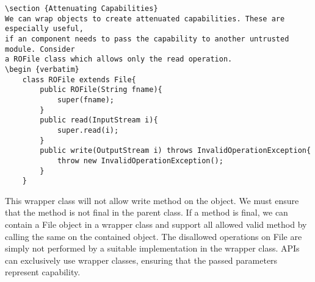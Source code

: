 \documentclass[11pt]{article} %
\begin{document}
\begin {verbatim}
\section {Attenuating Capabilities}
We can wrap objects to create attenuated capabilities. These are especially useful,
if an component needs to pass the capability to another untrusted module. Consider
a ROFile class which allows only the read operation.
\begin {verbatim}
    class ROFile extends File{
        public ROFile(String fname){
            super(fname);
        }
        public read(InputStream i){
            super.read(i);
        }
        public write(OutputStream i) throws InvalidOperationException{
            throw new InvalidOperationException();
        }
    }
\end {verbatim}
This wrapper class will not allow write method on the object. We must ensure
that the method is not final in the parent class. If a method is final, we can
contain a File object in a wrapper class and support all allowed valid method
by calling the same on the contained object. The disallowed operations on File
are simply not performed by a suitable implementation in the wrapper class. APIs
can exclusively use wrapper classes, ensuring that the passed parameters represent
capability.
\end{document}

